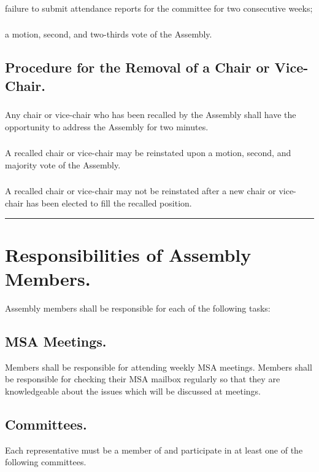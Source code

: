 \documentclass{rules}
\begin{document}
\subsubsection{}
failure to submit attendance reports for the committee for two consecutive weeks;
\subsubsection{}
a motion, second, and two-thirds vote of the Assembly.
\subsection{Procedure for the Removal of a Chair or Vice-Chair.}
\subsubsection{}
Any chair or vice-chair who has been recalled by the Assembly shall have the opportunity to address the Assembly for two minutes.
\subsubsection{}
A recalled chair or vice-chair may be reinstated upon a motion, second, and majority vote of the Assembly.
\subsubsection{}
A recalled chair or vice-chair may not be reinstated after a new chair or vice-chair has been elected to fill the recalled position. 


\rule{Member Obligations}


\section{Responsibilities of Assembly Members.}
Assembly members shall be responsible for each of the following tasks:
\subsection{MSA Meetings.}
Members shall be responsible for attending weekly MSA meetings. Members shall be responsible for checking their MSA mailbox regularly so that they are knowledgeable about the issues which will be discussed at meetings.
\subsection{Committees.}
Each representative must be a member of and participate in at least one of the following committees.
\end{document}
